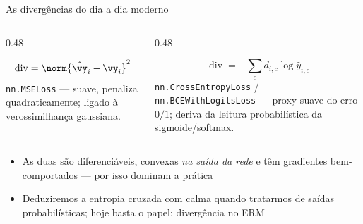 \documentclass[aspectratio=169, 11pt]{beamer}
\newcommand{\dive}{\operatorname{div}}   %
\begin{document}
\begin{frame}{As divergências do dia a dia moderno}
  \begin{columns}[T]
    \begin{column}{0.48\textwidth}
      \begin{tcolorbox}[iccaixa=icCiano, title={Regressão: erro quadrático}]
        \[
          \dive = \norm{\hat{\vy}_i - \vy_i}^2
        \]
        {\small \texttt{nn.MSELoss} — suave, penaliza quadraticamente;
        ligado à verossimilhança gaussiana.}
      \end{tcolorbox}
    \end{column}
    \begin{column}{0.48\textwidth}
      \begin{tcolorbox}[iccaixa=icMagenta, title={Classificação: entropia cruzada}]
        \[
          \dive = -\!\sum_c d_{i,c} \log \hat{y}_{i,c}
        \]
        {\small \texttt{nn.CrossEntropyLoss} / \texttt{nn.BCEWithLogitsLoss}
        — proxy suave do erro $0/1$; deriva da leitura probabilística
        da sigmoide/softmax.}
      \end{tcolorbox}
    \end{column}
  \end{columns}

  \medskip
  \begin{itemize}\setlength{\itemsep}{0.3ex}
    \item As duas são diferenciáveis, convexas \emph{na saída da rede} e têm
          gradientes bem-comportados — por isso dominam a prática
    \item Deduziremos a entropia cruzada com calma quando tratarmos de saídas
          probabilísticas; hoje basta o papel: \alert{divergência no ERM}
  \end{itemize}
\end{frame}
\end{document}
